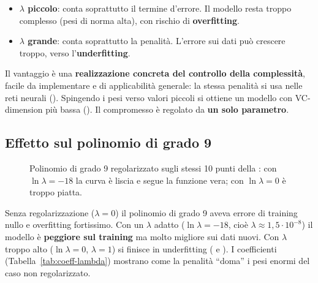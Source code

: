 \begin{itemize}
  \item \textbf{$\lambda$ piccolo}: conta soprattutto il termine d'errore. Il modello resta troppo complesso
        (pesi di norma alta), con rischio di \textbf{overfitting}.
  \item \textbf{$\lambda$ grande}: conta soprattutto la penalità. L'errore sui dati può crescere troppo, verso
        l'\textbf{underfitting}.
\end{itemize}
Il vantaggio è una \textbf{realizzazione concreta del controllo della complessità}, facile da implementare e di
applicabilità generale: la stessa penalità si usa nelle reti neurali (). Spingendo i pesi
verso valori piccoli si ottiene un modello con VC-dimension più bassa (). Il compromesso è regolato
da \textbf{un solo parametro}.

\subsection{Effetto sul polinomio di grado 9}

\begin{figure}[ht]
\centering
{}
\caption{Polinomio di grado 9 regolarizzato sugli stessi 10 punti della : con
$\ln\lambda=-18$ la curva è liscia e segue la funzione vera; con $\ln\lambda=0$ è troppo piatta.}
\label{fig:poly-reg}
\end{figure}

Senza regolarizzazione ($\lambda=0$) il polinomio di grado 9 aveva errore di training nullo e overfitting
fortissimo. Con un $\lambda$ adatto ($\ln\lambda = -18$, cioè $\lambda\approx1{,}5\cdot10^{-8}$) il modello è
\textbf{peggiore sul training} ma molto migliore sui dati nuovi. Con $\lambda$ troppo alto ($\ln\lambda=0$,
$\lambda=1$) si finisce in underfitting ( e ). I coefficienti
(Tabella~\ref{tab:coeff-lambda}) mostrano come la penalità ``doma'' i pesi enormi del caso non regolarizzato.

